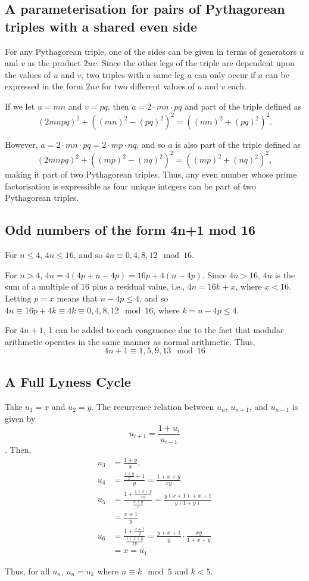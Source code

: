 \documentclass[11pt]{article}
\begin{document}
\begin{appendices}
\subsection{A parameterisation for pairs of Pythagorean triples with a shared even side}

For any Pythagorean triple, one of the sides can be given in terms of generators $u$ and $v$ as the product $2uv$. Since the other legs of the triple are dependent upon the values of $u$ and $v$, two triples with a same leg $a$ can only occur if $a$ can be expressed in the form $2uv$ for two different values of $u$ and $v$ each. 

If we let $u=mn$ and $v=pq$, then $a=2\cdot{mn}\cdot{pq}$ and part of the triple defined as
$$(2mnpq)^2+((mn)^2-(pq)^2)^2=((mn)^2+(pq)^2)^2.$$

However, $a=2\cdot{mn}\cdot{pq}=2\cdot{mp}\cdot{nq}$, and so $a$ is also part of the triple defined as
$$(2mnpq)^2+((mp)^2-(nq)^2)^2=((mp)^2+(nq)^2)^2,$$
making it part of two Pythagorean triples. Thus, any even number whose prime factorisation is expressible as four unique integers can be part of two Pythagorean triples.

\subsection{Odd numbers of the form 4n+1 mod 16}
For $n\leq{4}$, $4n\leq{16}$, and so $4n\equiv{0,4,8,12}\mod{16}$.

For $n>4$, $4n=4(4p+n-4p)=16p+4(n-4p)$. Since $4n>16$, $4n$ is the sum of a multiple of 16 plus a residual value, i.e., $4n=16k+x$, where $x<16$. Letting $p=x$ means that $n-4p\leq{4}$, and so $4n\equiv{16p+4k}\equiv{4k}\equiv{0,4,8,12}\mod{16}$, where $k=n-4p\leq{4}$.

For $4n+1$, 1 can be added to each congruence due to the fact that modular arithmetic operates in the same manner as normal arithmetic. Thus,
$$4n+1\equiv{1,5,9,13}\mod{16}$$

\subsection{A Full Lyness Cycle}
Take $u_1=x$ and $u_2=y$. The recurrence relation between $u_n$, $u_{n+1}$, and $u_{n-1}$ is given by
$$u_{i+1}=\frac{1+u_i}{u_{i-1}}$$.
Then,
\begin{equation*}
\begin{aligned}
u_3&=\frac{1+y}{x}, \\
u_4&=\frac{\frac{1+y}{x}+1}{y}=\frac{1+x+y}{xy}\\
u_5&=\frac{1+\frac{1+x+y}{xy}}{\frac{x+y}{x}}=\frac{y(x+1)+x+1}{y(1+y)}\\
&=\frac{x+1}{y} \\
u_6&=\frac{1+\frac{x+1}{y}}{\frac{1+x+y}{xy}}=\frac{y+x+1}{y}\cdot\frac{xy}{1+x+y}\\
&=x=u_1
\end{aligned}
\end{equation*}

Thus, for all $u_n$, $u_n=u_k$ where $n\equiv{k}\mod 5$ and $k<5$.


\end{appendices}
\end{document}
